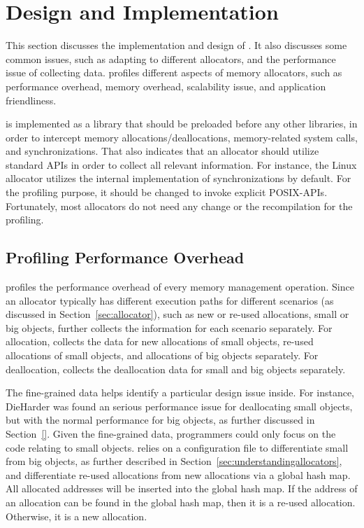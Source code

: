 \section{Design and Implementation}
\label{sec:implementation}

This section discusses the implementation and design of \MP{}. It also discusses some common issues, such as adapting to different allocators, and the performance issue of collecting data. \MP{} profiles different aspects of memory allocators, such as performance overhead, memory overhead, scalability issue, and application friendliness. 

\MP{} is implemented as a library that should be preloaded before any other libraries, in order to intercept memory allocations/deallocations, memory-related system calls, and synchronizations. That also indicates that an allocator should utilize standard APIs in order to collect all relevant information. For instance, the Linux allocator utilizes the internal implementation of synchronizations by default.  For the profiling purpose, it should be changed to invoke explicit POSIX-APIs. Fortunately, most allocators do not need any change or the recompilation for the profiling.    

\subsection{Profiling Performance Overhead}

\label{sec:performanceimplement}

\MP{} profiles the performance overhead of every memory management operation. Since an allocator typically has different execution paths for different scenarios (as discussed in Section~\ref{sec:allocator}), such as new or re-used allocations, small or big objects, \MP{} further collects the information for each scenario separately. For allocation, \MP{} collects the data for new allocations of small objects, re-used allocations of small objects, and  allocations of big objects separately. For deallocation, \MP{} collects the deallocation data for small and big objects separately. 


The fine-grained data helps identify a particular design issue inside. For instance, DieHarder was found an serious performance issue for deallocating small objects, but with the normal performance for big objects, as further discussed in Section~\ref{}. Given the fine-grained data, programmers could only focus on the code relating to small objects. \MP{} relies on a configuration file to differentiate small from big objects, as further described in Section~\ref{sec:understandingallocators}, and differentiate re-used allocations from new allocations via a global hash map. All allocated addresses will be inserted into the global hash map.  If the address of an allocation can be found in the global hash map, then it is a re-used allocation. Otherwise, it is a new allocation.  


